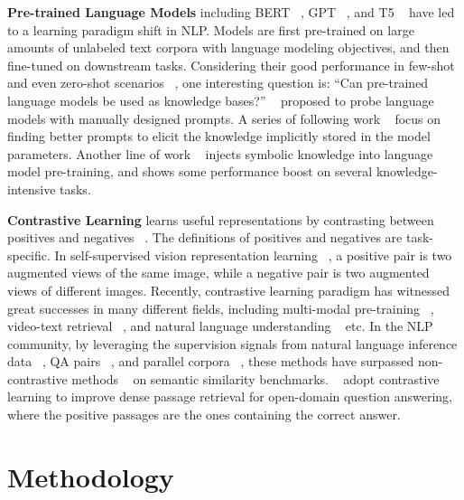 \documentclass[11pt]{article}
\begin{document}
\noindent
\textbf{Pre-trained Language Models }
including BERT ~\citep{devlin-etal-2019-bert},
GPT ~\citep{radford2018improving}, and T5 ~\citep{Raffel2020ExploringTL}
have led to a learning paradigm shift in NLP.
Models are first pre-trained on large amounts of unlabeled text corpora
with language modeling objectives,
and then fine-tuned on downstream tasks.
Considering their good performance in few-shot and
even zero-shot scenarios ~\citep{Brown2020LanguageMA},
one interesting question is:
``Can pre-trained language models be
used as knowledge bases?''
~\citet{petroni-etal-2019-language} proposed to probe language models
with manually designed prompts.
A series of following work ~\citep{shin-etal-2020-autoprompt,zhong2021factual,jiang-etal-2020-know}
focus on finding better prompts
to elicit the knowledge implicitly stored in the model parameters.
Another line of work ~\citep{zhang-etal-2019-ernie,liu2020k,wang2021kepler}
injects symbolic knowledge into language model pre-training,
and shows some performance boost on several knowledge-intensive tasks.
\newline

\noindent
\textbf{Contrastive Learning }
learns useful representations by contrasting
between positives and negatives ~\citep{le2020contrastive}.
The definitions of positives and negatives are task-specific.
In self-supervised vision representation learning
~\citep{chen2020simple,he2020momentum,grill2020bootstrap},
a positive pair is two augmented views of the same image,
while a negative pair is two augmented views of different images.
Recently,
contrastive learning paradigm has witnessed great successes
in many different fields,
including multi-modal pre-training ~\citep{radford2021learning},
video-text retrieval ~\citep{Liu2021HiTHT},
and natural language understanding ~\citep{gunel2020supervised} etc.
In the NLP community,
by leveraging the supervision signals from natural language inference data ~\citep{gao2021simcse},
QA pairs ~\citep{ni2021sentence},
and parallel corpora ~\citep{Wang2021AligningCS},
these methods have surpassed non-contrastive methods ~\citep{Reimers2019SentenceBERTSE}
on semantic similarity benchmarks.
~\citet{karpukhin-etal-2020-dense,qu-etal-2021-rocketqa,xiong2020approximate}
adopt contrastive learning to improve dense passage retrieval
for open-domain question answering,
where the positive passages are the ones containing the correct answer.

\section{Methodology}
\end{document}
